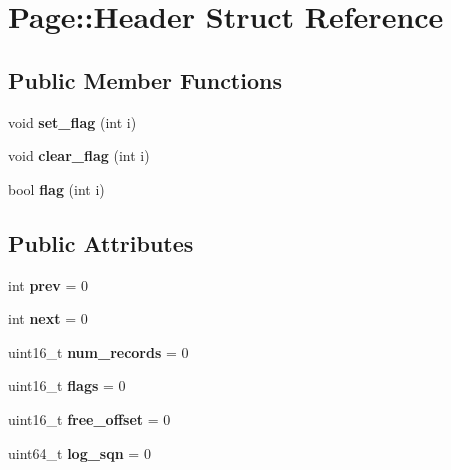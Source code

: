 \hypertarget{struct_page_1_1_header}{}\section{Page\+::Header Struct Reference}
\label{struct_page_1_1_header}
\subsection*{Public Member Functions}
\begin{DoxyCompactItemize}
\item 
\mbox{\label{struct_page_1_1_header_a59b4bcb230fa744bbaee775cb6969aba}} 
void {\bfseries set\+\_\+flag} (int i)
\item 
\mbox{\label{struct_page_1_1_header_a226549fc5821216702008ac5599e83c8}} 
void {\bfseries clear\+\_\+flag} (int i)
\item 
\mbox{\label{struct_page_1_1_header_a15fc7879aa14a12c11e017399dad89ed}} 
bool {\bfseries flag} (int i)
\end{DoxyCompactItemize}
\subsection*{Public Attributes}
\begin{DoxyCompactItemize}
\item 
\mbox{\label{struct_page_1_1_header_abc8ad611575544256c96256788ba9477}} 
int {\bfseries prev} = 0
\item 
\mbox{\label{struct_page_1_1_header_ab26efe9fca8811ea062cb7668a93cbd9}} 
int {\bfseries next} = 0
\item 
\mbox{\label{struct_page_1_1_header_afbd81bb6a83bd5841fc566afa7a0d43d}} 
uint16\+\_\+t {\bfseries num\+\_\+records} = 0
\item 
\mbox{\label{struct_page_1_1_header_a5630bcf47d3bec6860af1ede1c9b8088}} 
uint16\+\_\+t {\bfseries flags} = 0
\item 
\mbox{\label{struct_page_1_1_header_a3f32c86ed72fbea769c2218f53cf04c4}} 
uint16\+\_\+t {\bfseries free\+\_\+offset} = 0
\item 
\mbox{\label{struct_page_1_1_header_a04b8ccc32e10be32009b12b2ad758179}} 
uint64\+\_\+t {\bfseries log\+\_\+sqn} = 0
\end{DoxyCompactItemize}


